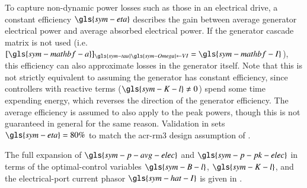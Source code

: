 To capture non-dynamic power losses such as those in an electrical drive, a constant efficiency $\gls{sym-eta}$ describes the gain between average generator electrical power and average absorbed electrical power.
\ifdefined\DISSERTATION
    If the generator cascade matrix is not used (i.e.\ $[\gls{sym-mathbf-a}]_{\gls{sym-tau}\gls{sym-Omega}\leftarrow VI} = \gls{sym-mathbf-I}$), this efficiency can also approximate losses in the generator itself.
    Note that this is not strictly equivalent to assuming the generator has constant efficiency, since controllers with reactive terms ($\gls{sym-K-l}\neq 0$) spend some time expending energy, which reverses the direction of the generator efficiency.
    The average efficiency is assumed to also apply to the peak powers, though this is not guaranteed in general for the same reason.
\fi
Validation in  sets $\gls{sym-eta}=80\%$ to match the \gls{acr-rm3} design assumption of \citet{RM3}.

The full expansion of $\gls{sym-p-avg-elec}$ and $\gls{sym-p-pk-elec}$ in terms of the optimal-control variables $\gls{sym-B-l}$, $\gls{sym-K-l}$, and the electrical-port current phasor $\gls{sym-hat-I}$ is given in .



